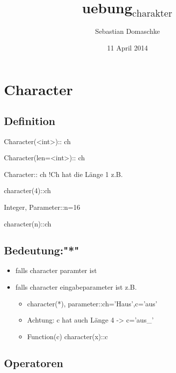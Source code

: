 \documentclass[11pt]{article}
\title{uebung$_{\mathrm{charakter}}$}
\author{Sebastian Domaschke}
\date{11 April 2014}
\begin{document}
\maketitle

\setcounter{tocdepth}{3}
\tableofcontents
\vspace*{1cm}
\section{Character}
\label{sec-1}

\subsection{Definition}
\label{sec-1.1}

\begin{description}
\item Character(<int>):: ch
\item Character(len=<int>):: ch
\item Character:: ch !Ch hat die Länge 1
     z.B.

\begin{description}
\item character(4)::ch
\item Integer, Parameter::n=16
\item character(n)::ch
\end{description}

\end{description}
\subsection{Bedeutung:"*"}
\label{sec-1.2}

\begin{itemize}
\item falls character paramter ist
\item falls character eingabeparameter ist
     z.B.

\begin{itemize}
\item character(*), parameter::ch='Haus',c='aus'
\item Achtung: c hat auch Länge 4 -> c='aus_'
\item Function(c)
       character(x)::c
\end{itemize}

\end{itemize}
\subsection{Operatoren}
\label{sec-1.3}
\end{document}
